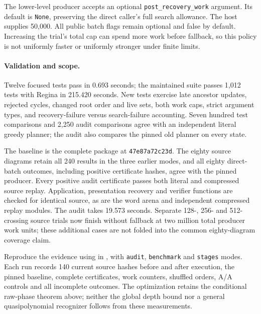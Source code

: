The lower-level producer accepts an optional
\texttt{post\_recovery\_work} argument. Its default is \texttt{None}, preserving
the direct caller's full search allowance. The host supplies 50,000. All
public batch flags remain optional and false by default. Increasing the
trial's total cap can spend more work before fallback, so this policy is
not uniformly faster or uniformly stronger under finite limits.

\paragraph{Validation and scope.}
Twelve focused tests pass in 0.693 seconds; the maintained suite passes
1,012 tests with Regina in 215.420 seconds. New tests exercise late ancestor
updates, rejected cycles, changed root order and live sets, both work caps,
strict argument types, and recovery-failure versus search-failure accounting.
Seven hundred test comparisons and 2,250 audit comparisons agree with an
independent literal greedy planner; the audit also compares the pinned old
planner on every state.

The baseline is the complete package at \texttt{47e87a72c23d}. The eighty
source diagrams retain all 240 results in the three earlier modes, and
all eighty direct-batch outcomes, including positive certificate hashes,
agree with the pinned producer.
Every positive audit certificate passes both literal and compressed source
replay. Application, presentation recovery and verifier functions are checked
for identical source, as are the word arena and independent compressed
replay modules. The audit takes 19.573 seconds. Separate 128-, 256- and
512-crossing source trials now finish without fallback at two million total
producer work units; these additional cases are not folded into the common
eighty-diagram coverage claim.



Reproduce the evidence using 
in , with \texttt{audit}, \texttt{benchmark} and \texttt{stages}
modes. Each run records 140 current source hashes before and after execution,
the pinned baseline, complete certificates, work counters, shuffled orders,
A/A controls and all incomplete outcomes. The optimization retains the
conditional raw-phase theorem above; neither the global depth bound nor
a general quasipolynomial recognizer follows from these measurements.
